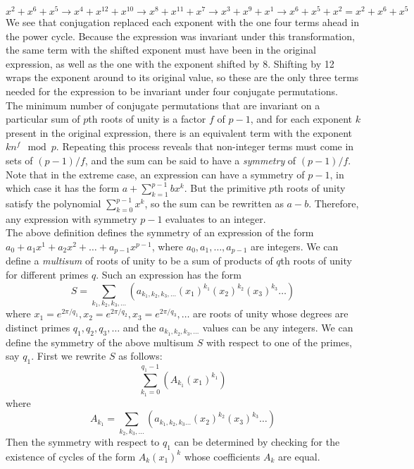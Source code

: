 \documentclass{article}
\begin{document}
	$$ x^2 + x^6 + x^5 \rightarrow x^4 + x^{12} + x^{10} \rightarrow x^8 + x^{11} + x^7 \rightarrow x^3 + x^9 + x^1 \rightarrow x^6 + x^5 + x^2 = x^2 + x^6 + x^5 $$
	We see that conjugation replaced each exponent with the one four terms ahead in the power cycle. Because the expression was invariant under this transformation, the same term with the shifted exponent must have been in the original expression, as well as the one with the exponent shifted by 8. Shifting by 12 wraps the exponent around to its original value, so these are the only three terms needed for the expression to be invariant under four conjugate permutations.\\
	The minimum number of conjugate permutations that are invariant on a particular sum of $ p $th roots of unity is a factor $ f $ of $ p - 1 $, and for each exponent $ k $ present in the original expression, there is an equivalent term with the exponent $ kn^f \mod p $. Repeating this process reveals that non-integer terms must come in sets of $ (p - 1)/f $, and the sum can be said to have a \textit{symmetry} of $ (p - 1)/f $.\\
	Note that in the extreme case, an expression can have a symmetry of $ p - 1 $, in which case it has the form $ a + \sum_{k = 1}^{p - 1} bx^k $. But the primitive $ p $th roots of unity satisfy the polynomial $ \sum_{k = 0}^{p - 1} x^k $, so the sum can be rewritten as $ a - b $. Therefore, any expression with symmetry $ p - 1 $ evaluates to an integer.\\
	The above definition defines the symmetry of an expression of the form $ a_0 + a_1 x^1 + a_2 x^2 + \dots + a_{p - 1} x^{p - 1} $, where $ a_0, a_1, \dots, a_{p - 1} $ are integers. We can define a \textit{multisum} of roots of unity to be a sum of products of $ q $th roots of unity for different primes $ q $. Such an expression has the form
	$$ S = \sum_{k_1, k_2, k_3, \dots} (a_{k_1, k_2, k_3, \dots} (x_1)^{k_1} (x_2)^{k_2} (x_3)^{k_3} \dots) $$
	where $ x_1 = e^{2\pi/q_1}, x_2 = e^{2\pi/q_2}, x_3 = e^{2\pi/q_3}, \dots $ are roots of unity whose degrees are distinct primes $ q_1, q_2, q_3, \dots $ and the $ a_{k_1, k_2, k_3, \dots} $ values can be any integers. We can define the symmetry of the above multisum $ S $ with respect to one of the primes, say $ q_1 $. First we rewrite $ S $ as follows:
	$$ \sum_{k_1 = 0}^{q_1 - 1} (A_{k_1} (x_1)^{k_1}) $$
	where
	$$ A_{k_1} = \sum_{k_2, k_3, \dots} (a_{k_1, k_2, k_3 \dots} (x_2)^{k_2} (x_3)^{k_3} \dots) $$
	Then the symmetry with respect to $ q_1 $ can be determined by checking for the existence of cycles of the form $ A_k (x_1)^k $ whose coefficients $ A_k $ are equal.\\
\end{document}
